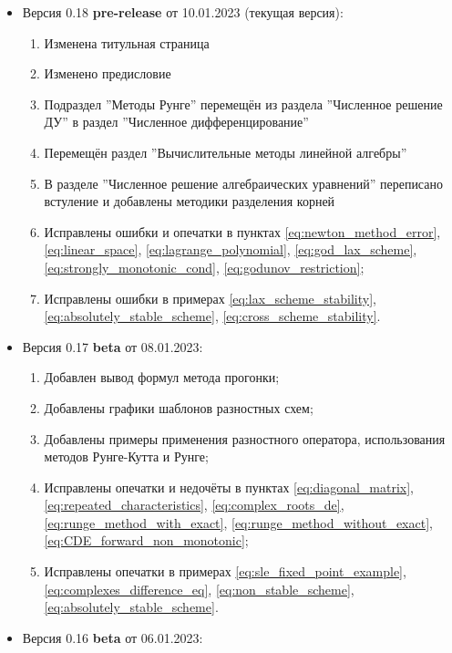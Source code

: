 \documentclass{article}
\begin{document}

\begin{itemize}[nosep]
\item Версия 0.18 \textbf{pre-release} от 10.01.2023 (текущая версия):
	\begin{enumerate}[nosep]
		\item Изменена титульная страница
		\item Изменено предисловие
		\item Подраздел ''Методы Рунге'' перемещён из раздела
			''Численное решение ДУ'' в раздел ''Численное
			дифференцирование''
		\item Перемещён раздел ''Вычислительные методы линейной
			алгебры''
		\item В разделе ''Численное решение алгебраических уравнений''
			переписано встуление и добавлены методики разделения
			корней
		\item Исправлены ошибки и опечатки в пунктах
			\eqref{eq:newton_method_error},
			\eqref{eq:linear_space},
			\eqref{eq:lagrange_polynomial}, 
			\eqref{eq:god_lax_scheme},
			\eqref{eq:strongly_monotonic_cond},
			\eqref{eq:godunov_restriction};
		\item Исправлены ошибки в примерах
			\eqref{eq:lax_scheme_stability},
			\eqref{eq:absolutely_stable_scheme},
			\eqref{eq:cross_scheme_stability}.
	\end{enumerate}
\item Версия 0.17 \textbf{beta} от 08.01.2023:
	\begin{enumerate}[nosep]
		\item Добавлен вывод формул метода прогонки;
		\item Добавлены графики шаблонов разностных схем;
		\item Добавлены примеры применения разностного оператора,
			использования методов Рунге-Кутта и Рунге;
		\item Исправлены опечатки и недочёты в пунктах
			\eqref{eq:diagonal_matrix},
			\eqref{eq:repeated_characteristics},
			\eqref{eq:complex_roots_de},
			\eqref{eq:runge_method_with_exact},
			\eqref{eq:runge_method_without_exact},
			\eqref{eq:CDE_forward_non_monotonic};
		\item Исправлены опечатки в примерах
			\eqref{eq:sle_fixed_point_example},
			\eqref{eq:complexes_difference_eq},
			\eqref{eq:non_stable_scheme},
			\eqref{eq:absolutely_stable_scheme}.
	\end{enumerate}
\item Версия 0.16 \textbf{beta} от 06.01.2023:

\end{itemize}
\end{document}
